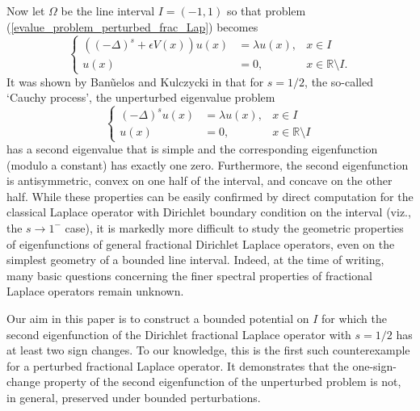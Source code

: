 \documentclass[preprint,12pt]{elsarticle}
\newcommand{\R}{\mathbb R}
\begin{document}
Now let $\Omega$ be the line interval $I=(-1,1)$ so that problem (\ref{evalue_problem_perturbed_frac_Lap}) becomes
\begin{equation}\label{evalue_problem_perturbed_frac_Lap_1d}
 \left\{\begin{aligned}
        ((-\Delta)^s+\epsilon V(x))u(x)&=\lambda u(x), &x\in I\\
        u(x)&=0, &x\in\R\setminus I.
       \end{aligned}
 \right.
\end{equation}
It was shown by Ban\~{u}elos and Kulczycki in \cite{BK} that for $s=1/2$, the so-called `Cauchy process', the unperturbed eigenvalue problem
\begin{equation}\label{evalue_problem_unperturbed_frac_Lap_1d}
 \left\{\begin{aligned}
        (-\Delta)^su(x)&=\lambda u(x), &x\in I\\
        u(x)&=0, &x\in\R\setminus I
       \end{aligned}
 \right.
\end{equation}
has a second eigenvalue that is simple and the corresponding eigenfunction (modulo a constant) has exactly one zero. Furthermore, the second eigenfunction is antisymmetric, convex on one half of the interval, and concave on the other half. While these properties can be easily confirmed by direct computation for the classical Laplace operator with Dirichlet boundary condition on the interval (viz., the $s\to 1^-$ case), it is markedly more difficult to study the geometric properties of eigenfunctions of general fractional Dirichlet Laplace operators, even on the simplest geometry of a bounded line interval. Indeed, at the time of writing, many basic questions concerning the finer spectral properties of fractional Laplace operators remain unknown. 

Our aim in this paper is to construct a bounded potential on $I$ for which
the second eigenfunction of the Dirichlet fractional Laplace operator with
$s=1/2$ has at least two sign changes. To our knowledge, this is the first
such counterexample for a perturbed fractional Laplace operator. It demonstrates that the one-sign-change property of the second eigenfunction of the unperturbed problem is not, in general, preserved under bounded perturbations. 
\end{document}
